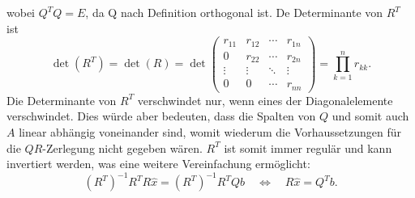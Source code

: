 wobei $Q^TQ=E$, da Q nach Definition orthogonal ist.
De Determinante von $R^T$ ist
\begin{equation*}
\det(R^T)=\det(R)=\det
\begin{pmatrix}
r_{11}&r_{12}&\cdots &r_{1n}\\
0     &r_{22}&\cdots &r_{2n}\\
\vdots&\vdots&\ddots&\vdots\\
0&0&\cdots&r_{nn}
\end{pmatrix}=\prod_{k=1}^{n}r_{kk}.
\end{equation*}
Die Determinante von $R^T$ verschwindet nur, wenn eines der Diagonalelemente verschwindet.
Dies würde aber bedeuten, dass die Spalten von $Q$ und somit auch $A$ linear abhängig voneinander sind, womit wiederum die Vorhaussetzungen für die $QR$-Zerlegung nicht gegeben wären.
$R^T$ ist somit immer regulär und kann invertiert werden, was eine weitere Vereinfachung ermöglicht:
\begin{equation}
(R^T)^{-1}R^TR\hat{x}=(R^T)^{-1}R^TQb\quad\Leftrightarrow\quad R\hat{x}=Q^Tb\label{qr:ls2}.
\end{equation}
